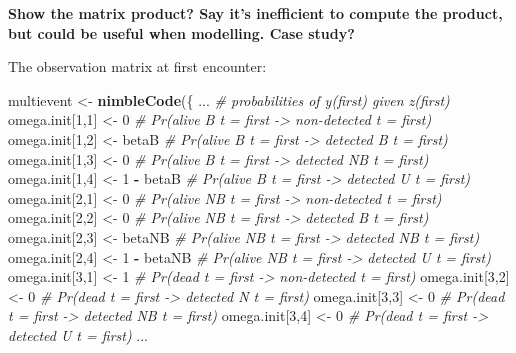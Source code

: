 \documentclass[
  12pt,
]{krantz}
\newenvironment{Shaded}{\begin{snugshade}}{\end{snugshade}}
\newcommand{\CommentTok}[1]{\textcolor[rgb]{0.56,0.35,0.01}{\textit{#1}}}
\newcommand{\DecValTok}[1]{\textcolor[rgb]{0.00,0.00,0.81}{#1}}
\newcommand{\FunctionTok}[1]{\textcolor[rgb]{0.13,0.29,0.53}{\textbf{#1}}}
\newcommand{\NormalTok}[1]{#1}
\newcommand{\OtherTok}[1]{\textcolor[rgb]{0.56,0.35,0.01}{#1}}
\newcommand{\SpecialCharTok}[1]{\textcolor[rgb]{0.81,0.36,0.00}{\textbf{#1}}}
\begin{document}
\textbf{Show the matrix product? Say it's inefficient to compute the product, but could be useful when modelling. Case study?}

The observation matrix at first encounter:

\begin{Shaded}
\begin{Highlighting}[]
\NormalTok{multievent }\OtherTok{\textless{}{-}} \FunctionTok{nimbleCode}\NormalTok{(\{}
\NormalTok{...}
  \CommentTok{\# probabilities of y(first) given z(first)}
\NormalTok{  omega.init[}\DecValTok{1}\NormalTok{,}\DecValTok{1}\NormalTok{] }\OtherTok{\textless{}{-}} \DecValTok{0}          \CommentTok{\# Pr(alive B t = first {-}\textgreater{} non{-}detected t = first)}
\NormalTok{  omega.init[}\DecValTok{1}\NormalTok{,}\DecValTok{2}\NormalTok{] }\OtherTok{\textless{}{-}}\NormalTok{ betaB      }\CommentTok{\# Pr(alive B t = first {-}\textgreater{} detected B t = first)}
\NormalTok{  omega.init[}\DecValTok{1}\NormalTok{,}\DecValTok{3}\NormalTok{] }\OtherTok{\textless{}{-}} \DecValTok{0}          \CommentTok{\# Pr(alive B t = first {-}\textgreater{} detected NB t = first)}
\NormalTok{  omega.init[}\DecValTok{1}\NormalTok{,}\DecValTok{4}\NormalTok{] }\OtherTok{\textless{}{-}} \DecValTok{1} \SpecialCharTok{{-}}\NormalTok{ betaB  }\CommentTok{\# Pr(alive B t = first {-}\textgreater{} detected U t = first)}
\NormalTok{  omega.init[}\DecValTok{2}\NormalTok{,}\DecValTok{1}\NormalTok{] }\OtherTok{\textless{}{-}} \DecValTok{0}          \CommentTok{\# Pr(alive NB t = first {-}\textgreater{} non{-}detected t = first)}
\NormalTok{  omega.init[}\DecValTok{2}\NormalTok{,}\DecValTok{2}\NormalTok{] }\OtherTok{\textless{}{-}} \DecValTok{0}          \CommentTok{\# Pr(alive NB t = first {-}\textgreater{} detected B t = first)}
\NormalTok{  omega.init[}\DecValTok{2}\NormalTok{,}\DecValTok{3}\NormalTok{] }\OtherTok{\textless{}{-}}\NormalTok{ betaNB     }\CommentTok{\# Pr(alive NB t = first {-}\textgreater{} detected NB t = first)}
\NormalTok{  omega.init[}\DecValTok{2}\NormalTok{,}\DecValTok{4}\NormalTok{] }\OtherTok{\textless{}{-}} \DecValTok{1} \SpecialCharTok{{-}}\NormalTok{ betaNB }\CommentTok{\# Pr(alive NB t = first {-}\textgreater{} detected U t = first)}
\NormalTok{  omega.init[}\DecValTok{3}\NormalTok{,}\DecValTok{1}\NormalTok{] }\OtherTok{\textless{}{-}} \DecValTok{1}          \CommentTok{\# Pr(dead t = first {-}\textgreater{} non{-}detected t = first)}
\NormalTok{  omega.init[}\DecValTok{3}\NormalTok{,}\DecValTok{2}\NormalTok{] }\OtherTok{\textless{}{-}} \DecValTok{0}          \CommentTok{\# Pr(dead t = first {-}\textgreater{} detected N t = first)}
\NormalTok{  omega.init[}\DecValTok{3}\NormalTok{,}\DecValTok{3}\NormalTok{] }\OtherTok{\textless{}{-}} \DecValTok{0}          \CommentTok{\# Pr(dead t = first {-}\textgreater{} detected NB t = first)}
\NormalTok{  omega.init[}\DecValTok{3}\NormalTok{,}\DecValTok{4}\NormalTok{] }\OtherTok{\textless{}{-}} \DecValTok{0}          \CommentTok{\# Pr(dead t = first {-}\textgreater{} detected U t = first)}
\NormalTok{...}
\end{Highlighting}
\end{Shaded}
\end{document}
